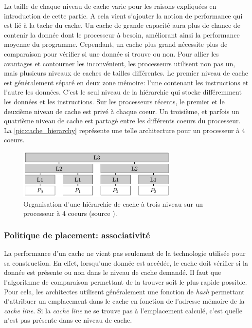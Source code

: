 La taille de chaque niveau de cache varie pour les raisons expliquées en introduction de cette partie. A cela vient s'ajouter la notion de performance qui est lié à la tache du cache. Un cache de grande capacité aura plus de chance de contenir la donnée dont le processeur à besoin, améliorant ainsi la performance moyenne du programme. Cependant, un cache plus grand nécessite plus de comparaison pour vérifier si une donnée si trouve ou non. Pour allier les avantages et contourner les inconvénient, les processeurs utilisent non pas un, mais plusieurs niveaux de caches de tailles différentes.
Le premier niveau de cache est généralement séparé en deux zone mémoire: l'une contenant les instructions et l'autre les données. C'est le seul niveau de la hiérarchie qui stocke différemment les données et les instructions. Sur les processeurs récents, le premier et le deuxième niveau de cache est privé à chaque coeur. Un troisième, et parfois un quatrième niveau de cache est partagé entre les différents coeurs du processeur. La \autoref{pic:cache_hierarchy} représente une telle architecture pour un processeur à 4 coeurs.

\begin{figure}
    \center
    \includegraphics[width=8cm]{images/cache_hierarchy.png}
    \caption{\label{pic:cache_hierarchy} Organisation d'une hiérarchie de cache à trois niveau sur un processeur à 4 coeurs (source \cite{putigny2014benchmark}).}
\end{figure}



\subsubsection{Politique de placement: associativité}
La performance d'un cache ne vient pas seulement de la technologie utilisée pour sa construction. En effet, lorsqu'une donnée est accédée, le cache doit vérifier si la donnée est présente ou non dans le niveau de cache demandé. Il faut que l'algorithme de comparaison permettant de la trouver soit le plus rapide possible. Pour cela, les architectes utilisent généralement une fonction de \textit{hash} permettant d'attribuer un emplacement dans le cache en fonction de l'adresse mémoire de la \textit{cache line}. Si la \textit{cache line} ne se trouve pas à l'emplacement calculé, c'est quelle n'est pas présente dans ce niveau de cache.


